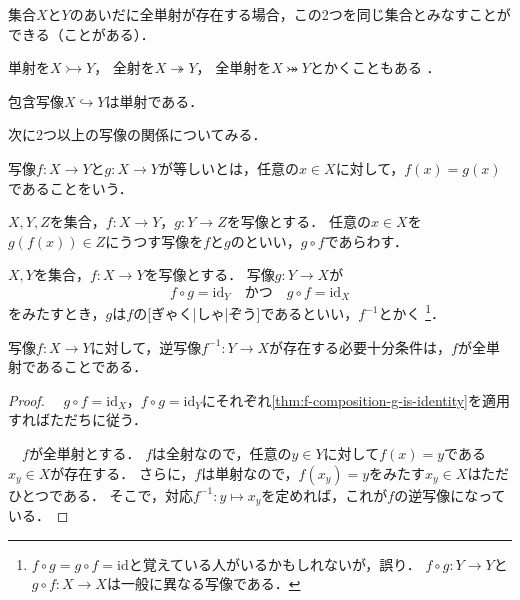 \documentclass[../sotsu.tex]{subfiles}
\begin{document}
集合$X$と$Y$のあいだに全単射が存在する場合，この2つを同じ集合とみなすことができる（ことがある）．

単射を$X \rightarrowtail Y$，
全射を$X \twoheadrightarrow Y$，
全単射を$X \twoheadrightarrowtail Y$とかくこともある%
\cite{unicode-arrows}\cite{unicode-arrows-B}．

\begin{example}
    包含写像$X \hookrightarrow Y$は単射である．
\end{example}

次に2つ以上の写像の関係についてみる．

\begin{definition}[写像の一致]
    写像$f \colon X \to Y$と$g \colon X \to Y$が等しいとは，任意の$x \in X$に対して，$f(x) = g(x)$であることをいう．
\end{definition}

\begin{definition}[写像の合成]
    \label{dfn:map-composition}
    $X, Y, Z$を集合，$f \colon X \to Y$，$g \colon Y \to Z$を写像とする．
    任意の$x \in X$を$g(f(x)) \in Z$にうつす写像を$f$と$g$のといい，$g \circ f$であらわす．
\end{definition}

\begin{definition}[逆写像]
    \label{dfn:inverse-map}
    $X, Y$を集合，$f \colon X \to Y$を写像とする．
    写像$g \colon Y \to X$が
    \[  f \circ g = \mathrm{id}_Y  \quad \text{かつ} \quad  g \circ f = \mathrm{id}_X  \]
    をみたすとき，$g$は$f$の[ぎゃく|しゃ|ぞう]であるといい，$f^{-1}$とかく%
    \footnote{
        $f \circ g = g \circ f = \mathrm{id}$と覚えている人がいるかもしれないが，誤り．
        $f \circ g \colon Y \to Y$と$g \circ f \colon X \to X$は一般に異なる写像である．
    }．
\end{definition}

\begin{theorem}
    \label{thm:inverse-map-exists-iff}
    写像$f \colon X \to Y$に対して，逆写像$f^{-1} \colon Y \to X$が存在する必要十分条件は，$f$が全単射であることである．
\end{theorem}

\begin{proof}
    　$g \circ f = \mathrm{id}_X$，$f \circ g = \mathrm{id}_Y$にそれぞれ\cref{thm:f-composition-g-is-identity}を適用すればただちに従う．

    　$f$が全単射とする．
    $f$は全射なので，任意の$y \in Y$に対して$f(x) = y$である$x_y \in X$が存在する．
    さらに，$f$は単射なので，$f(x_y) = y$をみたす$x_y \in X$はただひとつである．
    そこで，対応$f^{-1} \colon y \mapsto x_y$を定めれば，これが$f$の逆写像になっている．
\end{proof}
\end{document}
